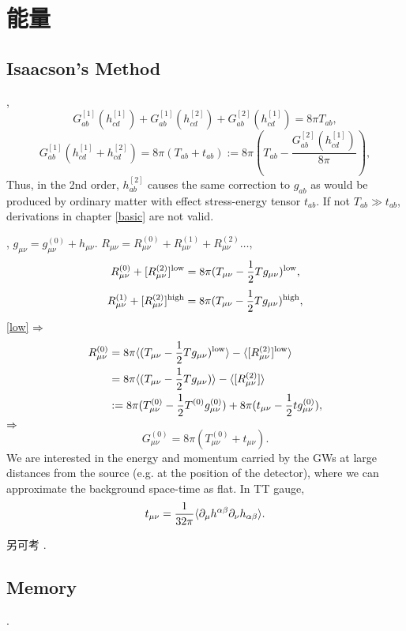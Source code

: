 \chapter{能量}

\section{Isaacson's Method}

\cite{Wald1984}, 
\begin{equation}
    G_{ab}^{[1]}(h_{cd}^{[1]})+G_{ab}^{[1]}(h_{cd}^{[2]})+G_{ab}^{[2]}(h_{cd}^{[1]})=8\pi T_{ab},
\end{equation}
\begin{equation}
    G_{ab}^{[1]}(h_{cd}^{[1]}+h_{cd}^{[2]})=8\pi (T_{ab}+t_{ab}):=8\pi (T_{ab}-\frac{G_{ab}^{[2]}(h_{cd}^{[1]})}{8\pi}),
\end{equation}
Thus, in the 2nd order, $h_{ab}^{[2]}$ causes the same correction to $g_{ab}$ as would be produced by ordinary matter with effect stress-energy tensor $t_{ab}$. If not $T_{ab}\gg t_{ab}$, derivations in chapter \ref{basic} are not valid.

\cite{Maggiore2014,Isaacson1968a}, $g_{\mu\nu}={g}_{\mu\nu}^{(0)}+h_{\mu\nu}$. $R_{\mu\nu}=R_{\mu\nu}^{(0)}+R_{\mu\nu}^{(1)}+R_{\mu\nu}^{(2)}\dots$,
\begin{equation}
    R_{\mu\nu}^{(0)}+[R_{\mu\nu}^{(2)}]^\text{low}=8\pi(T_{\mu\nu}-\frac{1}{2}Tg_{\mu\nu})^\text{low},\label{low}
\end{equation}
\begin{equation}
    R_{\mu\nu}^{(1)}+[R_{\mu\nu}^{(2)}]^\text{high}=8\pi(T_{\mu\nu}-\frac{1}{2}Tg_{\mu\nu})^\text{high},\label{high}
\end{equation}
\eqref{low} $\Rightarrow$
\begin{align}
    R_{\mu\nu}^{(0)}&=8\pi\langle (T_{\mu\nu}-\frac{1}{2}Tg_{\mu\nu})^\text{low}\rangle-\langle[R_{\mu\nu}^{(2)}]^\text{low}\rangle\\
    &=8\pi\langle (T_{\mu\nu}-\frac{1}{2}Tg_{\mu\nu})\rangle-\langle[R_{\mu\nu}^{(2)}]\rangle\\
    &:=8\pi({T}_{\mu\nu}^{(0)}-\frac{1}{2}{T}^{(0)}{g}_{\mu\nu}^{(0)})+8\pi(t_{\mu\nu}-\frac{1}{2}t{g}_{\mu\nu}^{(0)}),
\end{align}
$\Rightarrow$
\begin{equation}
    G_{\mu\nu}^{(0)}=8\pi({T}_{\mu\nu}^{(0)}+t_{\mu\nu}).
\end{equation}
We are interested in the energy and momentum carried by the GWs at large distances from the source (e.g.  at the position of the detector), where we can approximate the background space-time as flat. In TT gauge,
\begin{equation}
    t_{\mu\nu}=\frac{1}{32\pi}\langle\partial_\mu h^{\alpha\beta}\partial_\nu h_{\alpha\beta}\rangle.
\end{equation}

另可考 \cite{Flanagan2005}.

\section{Memory}

\cite{Favata2010}.
